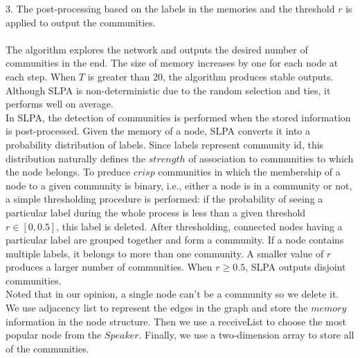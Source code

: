 \documentclass{article}
\begin{document}
3. The post-processing based on the labels in the memories and the threshold $r$ is applied to output the communities.\\\\
The algorithm explores the network and outputs the desired number of communities in the end. The size of memory increases by one for each node at each step. When $T$ is greater than 20, the algorithm produces stable outputs. Although SLPA is non-deterministic due to the random selection and ties, it performs well on average.\\
In SLPA, the detection of communities is performed when the stored information is post-processed. Given the memory of a node, SLPA converts it into a probability distribution of labels. Since labels represent community id, this distribution naturally defines the $strength$ of association to communities to which the node belongs. To preduce $crisp$ communities in which the membership of a node to a given community is binary, i.e., either a node is in a community or not, a simple thresholding procedure is performed: if the probability of seeing a particular label during the whole process is less than a given threshold $r \in [0, 0.5]$, this label is deleted. After thresholding, connected nodes having a particular label are grouped together and form a community. If a node contains multiple labels, it belongs to more than one community. A smaller value of $r$ produces a larger number of communities. When $r\geq 0.5$, SLPA outputs disjoint communities.\\
Noted that in our opinion, a single node can't be a community so we delete it.\\
We use adjacency list to represent the edges in the graph and store the $memory$ information in the node structure. Then we use a receiveList to choose the most popular node from the $Speaker$. Finally, we use a two-dimension array to store all of the communities.
\end{document}
